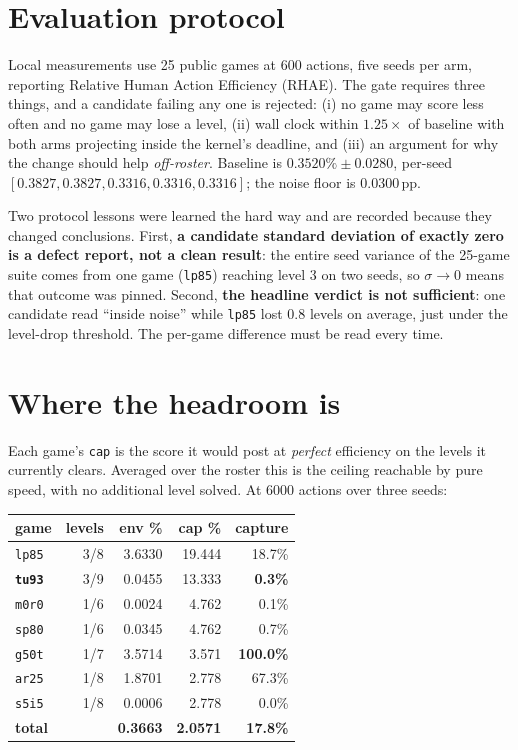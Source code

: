 \documentclass[11pt,a4paper]{article}
\newcommand{\pp}{\,\text{pp}}
\begin{document}
\section{Evaluation protocol}

Local measurements use 25 public games at 600 actions, five seeds per arm, reporting
Relative Human Action Efficiency (RHAE). The gate requires three things, and a candidate
failing any one is rejected: (i) no game may score less often and no game may lose a
level, (ii) wall clock within $1.25\times$ of baseline with both arms projecting inside
the kernel's deadline, and (iii) an argument for why the change should help
\emph{off-roster}. Baseline is $0.3520\% \pm 0.0280$, per-seed
$[0.3827, 0.3827, 0.3316, 0.3316, 0.3316]$; the noise floor is $0.0300\pp$.

Two protocol lessons were learned the hard way and are recorded because they changed
conclusions. First, \textbf{a candidate standard deviation of exactly zero is a defect
report, not a clean result}: the entire seed variance of the 25-game suite comes from
one game (\texttt{lp85}) reaching level 3 on two seeds, so $\sigma\to0$ means that
outcome was pinned. Second, \textbf{the headline verdict is not sufficient}: one
candidate read ``inside noise'' while \texttt{lp85} lost $0.8$ levels on average,
just under the level-drop threshold. The per-game difference must be read every time.

\section{Where the headroom is}

Each game's \texttt{cap} is the score it would post at \emph{perfect} efficiency on the
levels it currently clears. Averaged over the roster this is the ceiling reachable by
pure speed, with no additional level solved. At 6000 actions over three seeds:

\begin{center}
\begin{tabular}{lrrrr}
\toprule
game & levels & env \% & cap \% & capture \\
\midrule
\texttt{lp85} & 3/8 & 3.6330 & 19.444 & 18.7\% \\
\textbf{\texttt{tu93}} & 3/9 & 0.0455 & 13.333 & \textbf{0.3\%} \\
\texttt{m0r0} & 1/6 & 0.0024 & 4.762 & 0.1\% \\
\texttt{sp80} & 1/6 & 0.0345 & 4.762 & 0.7\% \\
\texttt{g50t} & 1/7 & 3.5714 & 3.571 & \textbf{100.0\%} \\
\texttt{ar25} & 1/8 & 1.8701 & 2.778 & 67.3\% \\
\texttt{s5i5} & 1/8 & 0.0006 & 2.778 & 0.0\% \\
\midrule
\multicolumn{2}{l}{\textbf{total}} & \textbf{0.3663} & \textbf{2.0571} & \textbf{17.8\%} \\
\bottomrule
\end{tabular}
\end{center}
\end{document}

